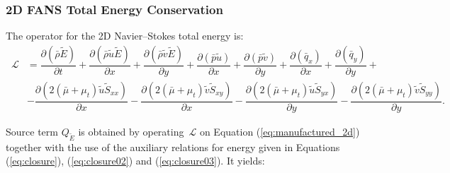 \documentclass[10pt]{article}
\newcommand{\Diff}[2] {\dfrac{\partial( #1)}{\partial #2}}
\newcommand{\Lo}{\,\mathcal{L}}
\newcommand{\brho}{\bar{\rho}}
\newcommand{\bp}{\bar{p}}
\newcommand{\bq}{\bar{q}}
\newcommand{\tu}{\tilde{u}}
\newcommand{\tv}{\tilde{v}}
\newcommand{\tS}{\tilde{S}}
\newcommand{\tE}{\tilde{E}}
\newcommand{\bmu}{\bar{\mu}}
\begin{document}
\subsubsection{2D FANS Total Energy Conservation}

The operator for the 2D Navier--Stokes total energy is:
\begin{equation*}
\begin{split}
\Lo&=  \Diff{\brho \tE }{t}+ \Diff{\brho \tu \tE }{x}+\Diff{\brho \tv \tE}{y}+\Diff{\bp\tu}{x} +\Diff{\bp\tv}{y} + \Diff{\bq_x}{x} +\Diff{\bq_y}{y} +\\
  &-\Diff{2(\bmu+\mu_t)\tu \tS_{xx}}{x}-\Diff{2(\bmu+\mu_t)\tv \tS_{xy}}{x}-\Diff{2(\bmu+\mu_t) \tu \tS_{yx}}{y}-\Diff{2(\bmu+\mu_t)\tv \tS_{yy}}{y}.
\end{split}
\end{equation*}

Source term $Q_{\tE}$ is obtained by operating $\Lo$ on Equation  (\ref{eq:manufactured_2d}) together with the use of the  auxiliary relations for energy given in Equations (\ref{eq:closure}),  (\ref{eq:closure02}) and (\ref{eq:closure03}). It yields:
\end{document}
